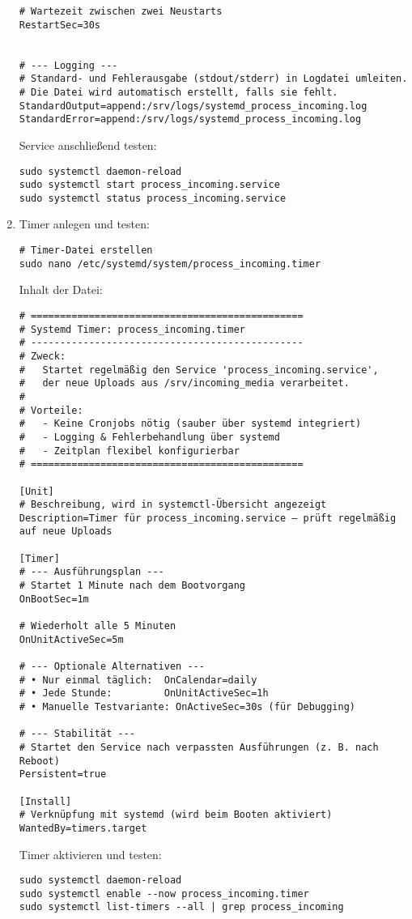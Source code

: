 \documentclass[12pt,a4paper]{report}
\begin{document}
\begin{enumerate}
\begin{verbatim}
# Wartezeit zwischen zwei Neustarts
RestartSec=30s


# --- Logging ---
# Standard- und Fehlerausgabe (stdout/stderr) in Logdatei umleiten.
# Die Datei wird automatisch erstellt, falls sie fehlt.
StandardOutput=append:/srv/logs/systemd_process_incoming.log
StandardError=append:/srv/logs/systemd_process_incoming.log
    \end{verbatim}

    \noindent Service anschließend testen:
    \begin{verbatim}
sudo systemctl daemon-reload
sudo systemctl start process_incoming.service
sudo systemctl status process_incoming.service
    \end{verbatim}

    \item Timer anlegen und testen:
    \begin{verbatim}
# Timer-Datei erstellen
sudo nano /etc/systemd/system/process_incoming.timer
    \end{verbatim}

    \noindent Inhalt der Datei:
    \begin{verbatim}
# ===============================================
# Systemd Timer: process_incoming.timer
# -----------------------------------------------
# Zweck:
#   Startet regelmäßig den Service 'process_incoming.service',
#   der neue Uploads aus /srv/incoming_media verarbeitet.
#
# Vorteile:
#   - Keine Cronjobs nötig (sauber über systemd integriert)
#   - Logging & Fehlerbehandlung über systemd
#   - Zeitplan flexibel konfigurierbar
# ===============================================

[Unit]
# Beschreibung, wird in systemctl-Übersicht angezeigt
Description=Timer für process_incoming.service – prüft regelmäßig auf neue Uploads

[Timer]
# --- Ausführungsplan ---
# Startet 1 Minute nach dem Bootvorgang
OnBootSec=1m

# Wiederholt alle 5 Minuten
OnUnitActiveSec=5m

# --- Optionale Alternativen ---
# • Nur einmal täglich:  OnCalendar=daily
# • Jede Stunde:         OnUnitActiveSec=1h
# • Manuelle Testvariante: OnActiveSec=30s (für Debugging)

# --- Stabilität ---
# Startet den Service nach verpassten Ausführungen (z. B. nach Reboot)
Persistent=true

[Install]
# Verknüpfung mit systemd (wird beim Booten aktiviert)
WantedBy=timers.target
    \end{verbatim}

    \noindent Timer aktivieren und testen:
    \begin{verbatim}
sudo systemctl daemon-reload
sudo systemctl enable --now process_incoming.timer
sudo systemctl list-timers --all | grep process_incoming
    \end{verbatim}
  \end{enumerate}
\end{document}
